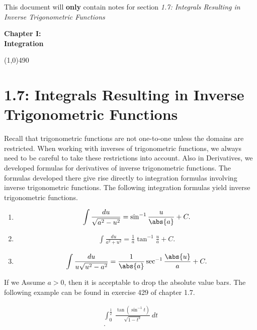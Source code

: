 \documentclass{report}
\begin{document}
    \bigbreak \noindent 
    This document will \textbf{only} contain notes for section \textit{1.7: Integrals Resulting in Inverse Trigonometric Functions}
    \pagebreak \bigbreak \noindent 
    \vspace{2in} \\
    \begin{Huge}
      \textbf{Chapter I: \\ Integration}  
    \end{Huge}
    \bigbreak \noindent 
    \line(1,0){490}
    \bigbreak \noindent 
    \section*{\LARGE 1.7: Integrals Resulting in Inverse Trigonometric Functions}
    \bigbreak \noindent 
    Recall that trigonometric functions are not one-to-one unless the domains are restricted. When working with inverses of trigonometric functions, we always need to be careful to take these restrictions into account. Also in Derivatives, we developed formulas for derivatives of inverse trigonometric functions. The formulas developed there give rise directly to integration formulas involving inverse trigonometric functions.
    \bigbreak \noindent 
    The following integration formulas yield inverse trigonometric functions. 
    \begin{enumerate}
        \item \begin{align*}
                \int \frac{du}{\sqrt{a^{2}-u^{2}}} = \sin^{-1}{\frac{u}{\abs{a}}} + C
        .\end{align*}
    \item \begin{align*}
        \int \frac{du}{a^{2}+u^{2}} = \frac{1}{a}\tan^{-1}{\frac{u}{a}} + C
    .\end{align*}
    \item \begin{align*}
            \int \frac{du}{u\sqrt{u^{2}-a^{2}}} = \frac{1}{\abs{a}}\sec^{-1}{\frac{\abs{u}}{a}} + C
    .\end{align*}
    \end{enumerate}
    If we Assume  $a>0$, then it is acceptable to drop the absolute value bars.
    \pagebreak \bigbreak \noindent 
    The following example can be found in exercise 429 of chapter 1.7. 
    \begin{examp}
        \begin{align*}
            \int_{0}^{\frac{1}{2}}\ \frac{\tan{(\sin^{-1}{t})}}{\sqrt{1-t^{2}}}\ dt \\
        .\end{align*}
    \end{examp}
\end{document}

